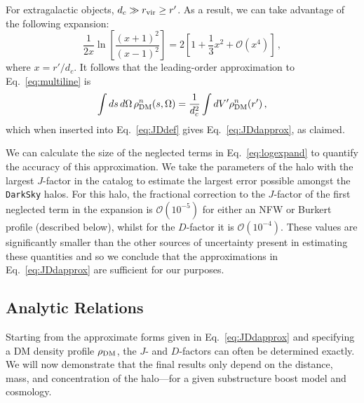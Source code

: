 For extragalactic objects, $d_c \gg r_{\rm vir} \geq r'$.  As a result, we can take advantage of the following  expansion:
\begin{equation}
\frac{1}{2x} \ln \left[ \frac{(x+1)^2}{(x-1)^2} \right]  = 2 \left[ 1 + \frac{1}{3} x^2 + \mathcal{O} \left(x^4\right) \right] \, ,
\label{eq:logexpand}
\end{equation}
where $x= r'/d_c$.  It follows that the leading-order approximation to Eq.~\ref{eq:multiline} is \begin{equation}\begin{aligned}
\int ds \, d\Omega \,\rho_{\rm DM}^n(s,\Omega) = \frac{1}{d_c^2} \int dV' \rho_{\rm DM}^n(r') \,,
\end{aligned}\end{equation}
which when inserted into Eq.~\ref{eq:JDdef} gives Eq.~\ref{eq:JDdapprox}, as claimed. 

We can calculate the size of the neglected terms in Eq.~\ref{eq:logexpand} to quantify the accuracy of this approximation.  We take the parameters of the halo with the largest $J$-factor in the catalog to estimate the largest error possible amongst the \texttt{DarkSky} halos.  For this halo, the fractional correction to the $J$-factor of the first neglected term in the expansion is $\mathcal{O}(10^{-5})$ for either an NFW or Burkert profile (described below), whilst for the $D$-factor it is $\mathcal{O}(10^{-4})$. These values are significantly smaller than the other sources of uncertainty present in estimating these quantities and so we conclude that the approximations in Eq.~\ref{eq:JDdapprox} are sufficient for our purposes.



\subsection{Analytic Relations}

Starting from the approximate forms given in Eq.~\ref{eq:JDdapprox} and specifying a DM density profile $\rho_{\rm DM}$, the $J$- and $D$-factors can often be determined exactly.   We will now demonstrate that the final results only depend on the distance, mass, and concentration of the halo---for a given substructure boost model and cosmology.

